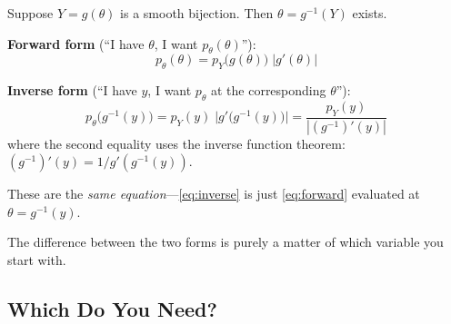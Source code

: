 \documentclass[11pt,a4paper]{article}
\theoremstyle{definition}
\begin{document}
Suppose $Y = g(\theta)$ is a smooth bijection. Then $\theta = g^{-1}(Y)$
exists.

\begin{keyresult}
\textbf{Forward form} (``I have $\theta$, I want $p_\theta(\theta)$''):
\begin{equation}
    \label{eq:forward}
    \boxed{p_\theta(\theta) = p_Y\!\big(g(\theta)\big) \; \big|g'(\theta)\big|}
\end{equation}

\vspace{6pt}
\textbf{Inverse form} (``I have $y$, I want $p_\theta$ at the corresponding
$\theta$''):
\begin{equation}
    \label{eq:inverse}
    p_\theta\!\big(g^{-1}(y)\big) = p_Y(y) \;
    \big|g'\!\big(g^{-1}(y)\big)\big|
    = \frac{p_Y(y)}{|(g^{-1})'(y)|}
\end{equation}
where the second equality uses the inverse function theorem:
$(g^{-1})'(y) = 1/g'(g^{-1}(y))$.

These are the \emph{same equation}---\eqref{eq:inverse} is just
\eqref{eq:forward} evaluated at $\theta = g^{-1}(y)$.
\end{keyresult}

The difference between the two forms is purely a matter of which variable you
start with.

\subsection{Which Do You Need?}
\end{document}
